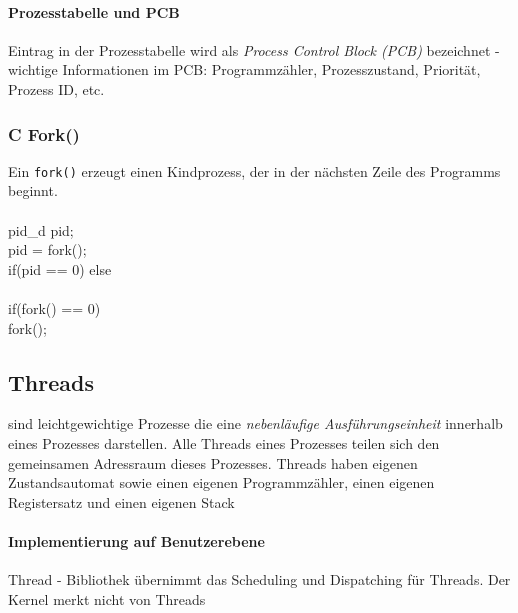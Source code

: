 \documentclass[10pt,a4paper,landscape]{article}
\newenvironment{allesInCode}{\ttfamily}{\par}
\begin{document}
\begin{multicols*}{3}
	\paragraph{Prozesstabelle und PCB} Eintrag in der Prozesstabelle wird als \textit{Process Control Block (PCB)} bezeichnet - wichtige Informationen im PCB: Programmzähler, Prozesszustand, Priorität, Prozess ID, etc.
	\subsubsection{C Fork()}
	Ein \texttt{fork()} erzeugt einen Kindprozess, der in der nächsten Zeile des Programms beginnt.\\\\
	\begin{allesInCode}
		pid\_d pid; \\
		pid = fork(); \\
		if(pid == 0)  else  \\\\
		if(fork() == 0)  \\
		fork(); \\
	\end{allesInCode}
	\subsection{Threads}
	sind leichtgewichtige Prozesse die eine \textit{nebenläufige Ausführungseinheit} innerhalb eines Prozesses darstellen. Alle Threads eines Prozesses teilen sich den gemeinsamen Adressraum dieses Prozesses. Threads haben eigenen Zustandsautomat sowie einen eigenen Programmzähler, einen eigenen Registersatz und einen eigenen Stack
	\paragraph{Implementierung auf Benutzerebene} Thread - Bibliothek übernimmt das Scheduling und Dispatching für Threads. Der Kernel merkt nicht von Threads

\end{multicols*}
\end{document}
